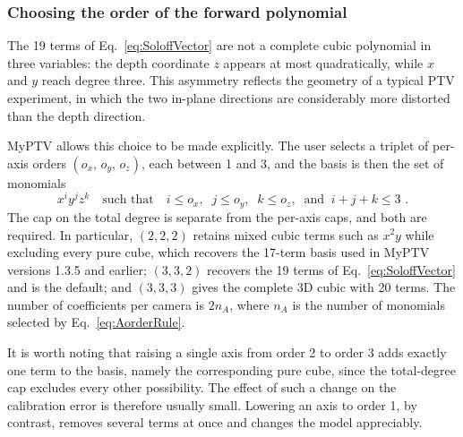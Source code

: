 \documentclass[10pt,a4paper]{article}
\begin{document}
\subsubsection{Choosing the order of the forward polynomial}
The 19 terms of Eq.~\eqref{eq:SoloffVector} are not a complete cubic polynomial in three variables: the depth coordinate $z$ appears at most quadratically, while $x$ and $y$ reach degree three. This asymmetry reflects the geometry of a typical PTV experiment, in which the two in-plane directions are considerably more distorted than the depth direction.

MyPTV allows this choice to be made explicitly. The user selects a triplet of per-axis orders $(o_x,\,o_y,\,o_z)$, each between 1 and 3, and the basis is then the set of monomials
%
\begin{equation}
	\label{eq:AorderRule}
	x^{i} y^{j} z^{k}
	\quad \text{such that} \quad
	i \le o_x, \;\; j \le o_y, \;\; k \le o_z,
	\;\; \text{and} \;\; i+j+k \le 3 \,\, .
\end{equation}
%
The cap on the total degree is separate from the per-axis caps, and both are required. In particular, $(2,2,2)$ retains mixed cubic terms such as $x^2y$ while excluding every pure cube, which recovers the 17-term basis used in MyPTV versions 1.3.5 and earlier; $(3,3,2)$ recovers the 19 terms of Eq.~\eqref{eq:SoloffVector} and is the default; and $(3,3,3)$ gives the complete 3D cubic with 20 terms. The number of coefficients per camera is $2 n_A$, where $n_A$ is the number of monomials selected by Eq.~\eqref{eq:AorderRule}.

It is worth noting that raising a single axis from order 2 to order 3 adds exactly one term to the basis, namely the corresponding pure cube, since the total-degree cap excludes every other possibility. The effect of such a change on the calibration error is therefore usually small. Lowering an axis to order 1, by contrast, removes several terms at once and changes the model appreciably.
\end{document}
